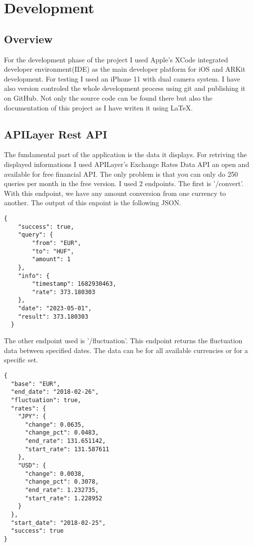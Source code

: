 \chapter{Development}

\section{Overview}
For the development phase of the project I used Apple's XCode integrated developer environment(IDE) as the main developer platform for iOS and ARKit development. For testing I used an iPhone 11 with dual camera system.
I have also version controled the whole development process using git and publishing it on GitHub. Not only the source code can be found there but also the documentation of this project as I have writen it using \LaTeX{}.

\section{APILayer Rest API}

The fundamental part of the application is the data it displays. For retriving the displayed informations I used APILayer's Exchange Rates Data API an open and available for free financial API.  The only problem is that you can only do 250 queries per month in the free version. I used 2 endpoints. The first is '/convert'. With this endpoint, we have any amount conversion from one currency to another. The output of this enpoint is the following JSON.

\begin{lstlisting}[frame=single,float=!ht,caption=JSON from /convert endpoint, label=listing:Bibtex]
  {
    "success": true,
    "query": {
        "from": "EUR",
        "to": "HUF",
        "amount": 1
    },
    "info": {
        "timestamp": 1682930463,
        "rate": 373.180303
    },
    "date": "2023-05-01",
    "result": 373.180303
  }
\end{lstlisting}

The other endpoint used is '/fluctuation'. This endpoint returns the fluctuation data between specified dates. The data can be for all available currencies or for a specific set.
\begin{lstlisting}[frame=single,float=!ht,caption=JSON from /fluctuation endpoint, label=listing:Bibtex]
{
  "base": "EUR",
  "end_date": "2018-02-26",
  "fluctuation": true,
  "rates": {
    "JPY": {
      "change": 0.0635,
      "change_pct": 0.0483,
      "end_rate": 131.651142,
      "start_rate": 131.587611
    },
    "USD": {
      "change": 0.0038,
      "change_pct": 0.3078,
      "end_rate": 1.232735,
      "start_rate": 1.228952
    }
  },
  "start_date": "2018-02-25",
  "success": true
}
\end{lstlisting}

